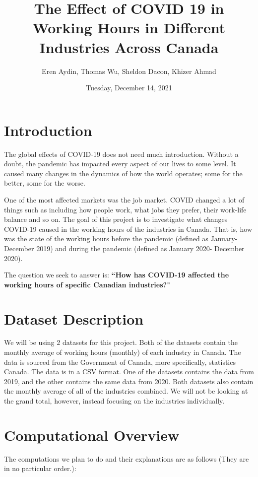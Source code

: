\documentclass[fontsize=11pt]{article}
\title{  
The Effect of COVID 19 in Working Hours in Different Industries Across Canada}
\author{Eren Aydin, Thomas Wu, Sheldon Dacon, Khizer Ahmad}
\date{Tuesday, December 14, 2021}
\begin{document}
  
\maketitle  
  
\section*{Introduction}  
The global effects of COVID-19 does not need much introduction. Without a doubt, the pandemic has impacted every aspect of our lives to some level. It caused many changes in the dynamics of how the world operates; some for the better, some for the worse.   
  
One of the most affected markets was the job market. COVID changed a lot of things such as including how people work, what jobs they prefer, their work-life balance and so on. The goal of this project is to investigate what changes COVID-19 caused in the working hours of the industries in Canada. That is, how was the state of the working hours before the pandemic (defined as January-December 2019) and during the pandemic (defined as January 2020- December 2020).  
  
The question we seek to answer is:   
\textbf{``How has COVID-19 affected the working hours of specific Canadian industries?"}  
  
  
\section*{Dataset Description}  
We will be using 2 datasets for this project. Both of the datasets contain the monthly average of working hours (monthly) of each industry in Canada. The data is sourced from the Government of Canada, more specifically, statistics Canada. The data is in a CSV format. One of the datasets contains the data from 2019, and the other contains the same data from 2020. Both datasets also contain the monthly average of all of the industries combined. We will not be looking at the grand total, however, instead focusing on the industries individually.   
 
 

 
 
  
\section*{Computational Overview}  
The computations we plan to do and their explanations are as follows (They are in no particular order.):  
  
\end{document}
